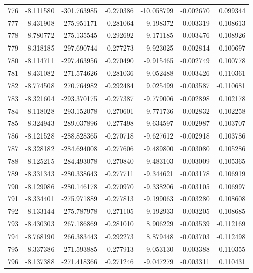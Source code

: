 \begin{tabular}{rrrrrrr}
 776 &  -8.111580 & -301.763985 & -0.270386 &  -10.058799 &   -0.002670 &  0.099344 \\
 777 &  -8.431908 &  275.951171 & -0.281064 &    9.198372 &   -0.003319 & -0.108613 \\
 778 &  -8.780772 &  275.135545 & -0.292692 &    9.171185 &   -0.003476 & -0.108926 \\
 779 &  -8.318185 & -297.690744 & -0.277273 &   -9.923025 &   -0.002814 &  0.100697 \\
 780 &  -8.114711 & -297.463956 & -0.270490 &   -9.915465 &   -0.002749 &  0.100778 \\
 781 &  -8.431082 &  271.574626 & -0.281036 &    9.052488 &   -0.003426 & -0.110361 \\
 782 &  -8.774508 &  270.764982 & -0.292484 &    9.025499 &   -0.003587 & -0.110681 \\
 783 &  -8.321604 & -293.370175 & -0.277387 &   -9.779006 &   -0.002898 &  0.102178 \\
 784 &  -8.118028 & -293.152078 & -0.270601 &   -9.771736 &   -0.002832 &  0.102258 \\
 785 &  -8.324943 & -289.037896 & -0.277498 &   -9.634597 &   -0.002987 &  0.103707 \\
 786 &  -8.121528 & -288.828365 & -0.270718 &   -9.627612 &   -0.002918 &  0.103786 \\
 787 &  -8.328182 & -284.694008 & -0.277606 &   -9.489800 &   -0.003080 &  0.105286 \\
 788 &  -8.125215 & -284.493078 & -0.270840 &   -9.483103 &   -0.003009 &  0.105365 \\
 789 &  -8.331343 & -280.338643 & -0.277711 &   -9.344621 &   -0.003178 &  0.106919 \\
 790 &  -8.129086 & -280.146178 & -0.270970 &   -9.338206 &   -0.003105 &  0.106997 \\
 791 &  -8.334401 & -275.971889 & -0.277813 &   -9.199063 &   -0.003280 &  0.108608 \\
 792 &  -8.133144 & -275.787978 & -0.271105 &   -9.192933 &   -0.003205 &  0.108685 \\
 793 &  -8.430303 &  267.186869 & -0.281010 &    8.906229 &   -0.003539 & -0.112169 \\
 794 &  -8.768190 &  266.383443 & -0.292273 &    8.879448 &   -0.003703 & -0.112498 \\
 795 &  -8.337386 & -271.593885 & -0.277913 &   -9.053130 &   -0.003388 &  0.110355 \\
 796 &  -8.137388 & -271.418366 & -0.271246 &   -9.047279 &   -0.003311 &  0.110431 \\

\end{tabular}

